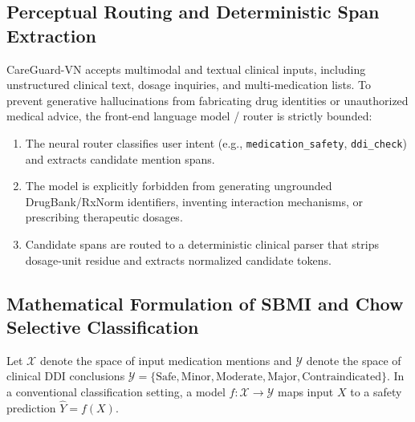 \documentclass[11pt]{article}
\begin{document}
\subsection{Perceptual Routing and Deterministic Span Extraction}
CareGuard-VN accepts multimodal and textual clinical inputs, including unstructured clinical text, dosage inquiries, and multi-medication lists. To prevent generative hallucinations from fabricating drug identities or unauthorized medical advice, the front-end language model / router is strictly bounded:
\begin{enumerate}[leftmargin=*]
  \item The neural router classifies user intent (e.g., \texttt{medication\_safety}, \texttt{ddi\_check}) and extracts candidate mention spans.
  \item The model is explicitly forbidden from generating ungrounded DrugBank/RxNorm identifiers, inventing interaction mechanisms, or prescribing therapeutic dosages.
  \item Candidate spans are routed to a deterministic clinical parser that strips dosage-unit residue and extracts normalized candidate tokens.
\end{enumerate}

\subsection{Mathematical Formulation of SBMI and Chow Selective Classification}
Let $\mathcal{X}$ denote the space of input medication mentions and $\mathcal{Y}$ denote the space of clinical DDI conclusions $\mathcal{Y} = \{\text{Safe}, \text{Minor}, \text{Moderate}, \text{Major}, \text{Contraindicated}\}$. In a conventional classification setting, a model $f: \mathcal{X} \to \mathcal{Y}$ maps input $X$ to a safety prediction $\hat{Y} = f(X)$.
\end{document}
